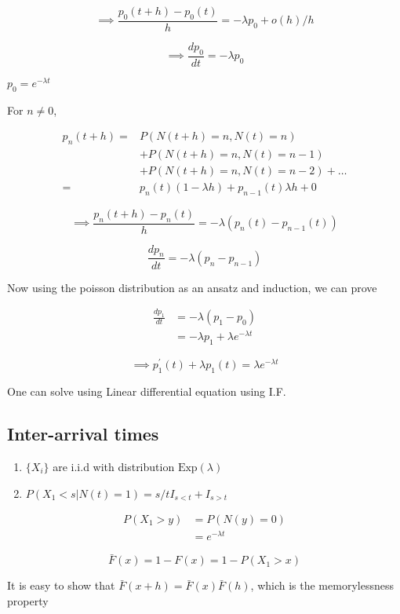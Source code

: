 \[\implies \frac{p_0(t+h) - p_0(t)}{h} = -\lambda p_0 + o(h)/h\]

\[\implies \frac{d p_0}{d t} = -\lambda p_0\]

\(p_0 = e^{-\lambda t}\)

For \(n \ne 0\),

\[\begin{aligned}
p_n(t+h) =& P(N(t+h) = n, N(t) = n) \\
&+ P(N(t+h) = n, N(t) = n-1) \\
&+ P(N(t+h) = n, N(t) = n-2) + \dots \\
=& p_n(t)(1-\lambda h) + p_{n-1}(t) \lambda h + 0
\end{aligned}\]

\[\implies \frac{p_n(t+h) - p_n(t)}{h} = -\lambda (p_n(t) - p_{n-1}(t))\]

\[\frac{d p_n}{d t} = -\lambda (p_n -p_{n-1})\]

Now using the poisson distribution as an ansatz and induction, we can
prove

\[\begin{aligned}
\frac{d p_1}{d t} &= -\lambda (p_1 -p_0)\\
&= - \lambda p_1 + \lambda e^{-\lambda t}
\end{aligned}\]

\[\implies p_1^\prime(t) + \lambda p_1(t) = \lambda e^{-\lambda t}\]

One can solve using Linear differential equation using I.F.

\hypertarget{inter-arrival-times}{%
\subsection{Inter-arrival times}\label{inter-arrival-times}}

\begin{enumerate}
\def\labelenumi{\arabic{enumi}.}
\tightlist
\item
  \(\{X_i\}\) are i.i.d with distribution \(\text{Exp}(\lambda)\)
\item
  \(P(X_1 < s | N(t)=1) = s/t I_{s < t} + I_{s > t}\)
\end{enumerate}

\[\begin{aligned}
P(X_1 > y) &= P(N(y) = 0)\\
           &= e^{-\lambda t}
\end{aligned}\]

\[\bar{F}(x) = 1- F(x) = 1- P(X_1 > x)\]

It is easy to show that \(\bar{F}(x+h) = \bar{F}(x)\bar{F}(h)\), which
is the memorylessness property

